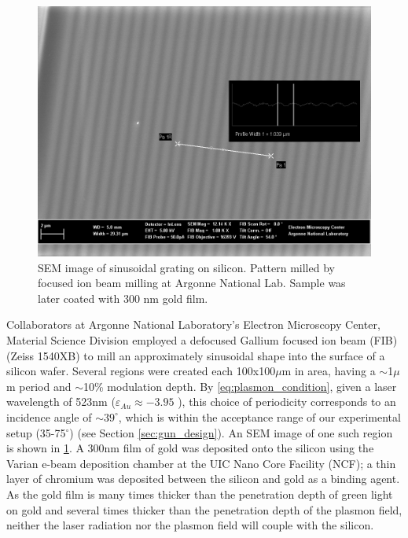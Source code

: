\begin{figure}
  \centering
  \includegraphics{HighMagSEM.jpg}
  \caption[SEM image of sinusoidal grating on silicon]{
    SEM image of sinusoidal grating on silicon.
    Pattern milled by focused ion beam milling at Argonne National Lab.
    Sample was later coated with 300 nm gold film.
  }
  \label{fig:fib-si-sem}
\end{figure}

Collaborators at Argonne National Laboratory's Electron Microscopy Center, Material Science Division employed a defocused Gallium focused ion beam (FIB) (Zeiss 1540XB) to mill an approximately sinusoidal shape into the surface of a silicon wafer.
Several regions were created each 100x100$\mu$m in area, having a $\sim$1$\mu$m period and $\sim$10\% modulation depth.
By \ref{eq:plasmon_condition}, given a laser wavelength of 523nm ($\varepsilon_{Au} \approx -3.95$ \cite{johnson_optical_1972}), this choice of periodicity corresponds to an incidence angle of $\sim39^{\circ}$, which is within the acceptance range of our experimental setup (35-75$^{\circ}$) (see Section \ref{sec:gun_design}).
An SEM image of one such region is shown in \ref{fig:fib-si-sem}.
A 300nm film of gold was deposited onto the silicon using the Varian e-beam deposition chamber at the UIC Nano Core Facility (NCF); a thin layer of chromium was deposited between the silicon and gold as a binding agent.
As the gold film is many times thicker than the penetration depth of green light on gold and several times thicker than the penetration depth of the plasmon field, neither the laser radiation nor the plasmon field will couple with the silicon.

